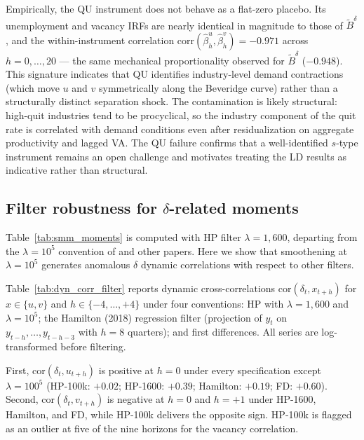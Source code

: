 \documentclass[authoryear, review, 12pt]{elsarticle}
\begin{document}
	Empirically, the QU instrument does not behave as a flat-zero placebo.
	Its unemployment and vacancy IRFs are nearly identical in magnitude to
	those of $\tilde{B}^\delta$, and the within-instrument correlation
	$\text{corr}(\hat\beta^u_h, \hat\beta^v_h) = -0.971$ across $h =
	0,\ldots,20$ --- the same mechanical proportionality observed for
	$\tilde{B}^\delta$ ($-0.948$).  This signature indicates that QU
	identifies industry-level demand contractions (which move $u$ and $v$
	symmetrically along the Beveridge curve) rather than a structurally
	distinct separation shock.  The contamination is likely structural:
	high-quit industries tend to be procyclical, so the industry component
	of the quit rate is correlated with demand conditions even after
	residualization on aggregate productivity and lagged VA.  The QU
	failure confirms that a well-identified $s$-type instrument remains an
	open challenge and motivates treating the LD results as indicative
	rather than structural.


	\subsection{Filter robustness for \texorpdfstring{$\delta$}{delta}-related moments}\label{app:filter_robustness}

	Table~\ref{tab:smm_moments} is computed with HP filter $\lambda=1{,}600$,
	departing from the $\lambda=10^5$ convention of \citep{shimer_2005, coles_2018} and other papers. Here we show that smoothening at $\lambda=10^5$ generates anomalous $\delta$ dynamic correlations with respect to other filters.

	Table~\ref{tab:dyn_corr_filter} reports dynamic cross-correlations
	$\text{cor}(\delta_t, x_{t+h})$ for $x \in \{u, v\}$ and
	$h \in \{-4, \ldots, +4\}$ under four conventions: HP with
	$\lambda=1{,}600$ and $\lambda=10^5$; the Hamilton (2018) regression
	filter (projection of $y_t$ on $y_{t-h},\ldots,y_{t-h-3}$ with $h=8$
	quarters); and first differences.  All series are log-transformed before
	filtering.

	First, $\text{cor}(\delta_t, u_{t+h})$ is
	positive at $h=0$ under every specification except $\lambda=100^5$
	(HP-100k: $+0.02$; HP-1600: $+0.39$; Hamilton: $+0.19$; FD: $+0.60$).
	Second, $\text{cor}(\delta_t, v_{t+h})$ is negative at $h=0$ and $h=+1$
	under HP-1600, Hamilton, and FD, while HP-100k delivers the opposite sign.
	HP-100k is flagged as an outlier at five of the nine horizons for the
	vacancy correlation.  
\end{document}
